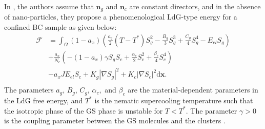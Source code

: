 \documentclass[reprint,amsfonts,amsmath,amssymb,aps,pre,floatfix,10pt]{revtex4-1}
\newcommand\dd{\mathrm{d}}
\newcommand\x{\mathbf{x}}
\newcommand\n{\mathbf{n}}
\newcommand\Q{\mathbf{Q}}
\begin{document}
In \cite{patranabish2019one_37}, the authors assume that $\n_g$ and $\n_c$ are constant directors, and in the absence of nano-particles, they propose a phenomenological LdG-type energy for a confined BC sample as given below:
\begin{equation}\label{Energy1}
 \begin{aligned}
   \mathcal{F} & =  \int_{\Omega} (1 - a_x) \left( \frac{a_g}{2}(T - T^{*})S_g^2 - \frac{B_g}{3} S_g^3 + \frac{C_g}{4} S_g^4 - E_{el} S_g    \right) \\
   & + \frac{a_x}{N_c} \left( - (1 - a_x) \gamma S_g S_c + \frac{\alpha_c}{2} S_c^2 + \frac{\beta_c}{4} S_c^4  \right) \\
   & - a_xJ E_{el} S_c  + K_g |\nabla S_g|^2 + K_c |\nabla S_c|^2 \dd \x.  \\
   \end{aligned}
\end{equation}
The parameters $a_g$, $B_g$, $C_g$, $\alpha_c,$ and $\beta_c$ are the material-dependent parameters in the LdG free energy, and $T^*$ is the nematic supercooling temperature such that the isotropic phase of the GS phase is unstable for $T < T^*$. The parameter
$\gamma > 0$ is the coupling parameter between the GS molecules and
the clusters \cite{madhusudana2017two_36}.
\end{document}

